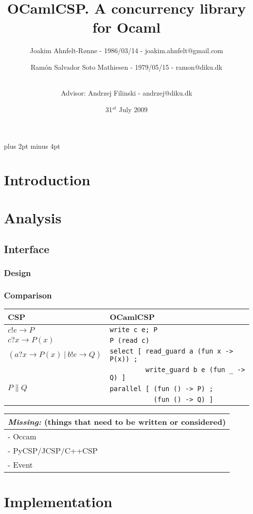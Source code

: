 \documentclass[a4paper,12pt]{article}
\title{OCamlCSP. A concurrency library for Ocaml}
\author{Joakim Ahnfelt-Rønne - 1986/03/14 - joakim.ahnfelt@gmail.com \and 
        Ramón Salvador Soto Mathiesen - 1979/05/15 - ramon@diku.dk \and
        \\ Advisor: Andrzej Filinski - andrzej@diku.dk}
\date{31$^{st}$ July 2009}
\newcommand{\missing}[1]{
\begin{tabular}{|p{11cm}|}
\hline
\emph{Missing:} {\scriptsize (things that need to be written or considered)} \\
\hline
#1
\hline
\end{tabular}
}
\begin{document}
\maketitle
\newpage
\tableofcontents

\parindent=0pt
\parskip=8pt plus 2pt minus 4pt

\newpage
\section{Introduction}

\section{Analysis}

\subsection{Interface}

\subsubsection{Design}

\subsubsection{Comparison}

\begin{tabular}{l|l}
CSP & OCamlCSP \\
\hline
$c!e \to P$ & \texttt{write c e; P} \\
\hline
$c?x \to P(x)$ & \texttt{P (read c)} \\
\hline
$(a?x \to P(x)\ |\ b!e \to Q)$ 
&\verb|select [ read_guard a (fun x -> P(x)) ;| \\
&\verb|         write_guard b e (fun _ -> Q) ]|\\
\hline
$P \parallel Q$ 
&\verb|parallel [ (fun () -> P) ;| \\
&\verb|           (fun () -> Q) ]| \\
\end{tabular}

\missing{
- Occam \\
- PyCSP/JCSP/C++CSP \\
- Event \\
}


\section{Implementation}
\end{document}
